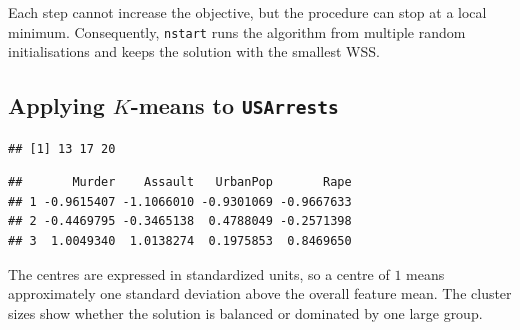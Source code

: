 \documentclass[
  11pt,
]{article}
\newenvironment{Shaded}{\begin{snugshade}}{\end{snugshade}}
\newcommand{\AttributeTok}[1]{\textcolor[rgb]{0.13,0.29,0.53}{#1}}
\newcommand{\DecValTok}[1]{\textcolor[rgb]{0.00,0.00,0.81}{#1}}
\newcommand{\FunctionTok}[1]{\textcolor[rgb]{0.13,0.29,0.53}{\textbf{#1}}}
\newcommand{\NormalTok}[1]{#1}
\newcommand{\OtherTok}[1]{\textcolor[rgb]{0.56,0.35,0.01}{#1}}
\newcommand{\SpecialCharTok}[1]{\textcolor[rgb]{0.81,0.36,0.00}{\textbf{#1}}}
\begin{document}
Each step cannot increase the objective, but the procedure can stop at a
local minimum. Consequently, \texttt{nstart} runs the algorithm from
multiple random initialisations and keeps the solution with the smallest
WSS.

\subsection{\texorpdfstring{Applying \(K\)-means to
\texttt{USArrests}}{Applying K-means to USArrests}}\label{applying-k-means-to-usarrests}

\begin{Shaded}
\end{Shaded}

\begin{verbatim}
## [1] 13 17 20
\end{verbatim}

\begin{Shaded}
\end{Shaded}

\begin{verbatim}
##       Murder    Assault   UrbanPop       Rape
## 1 -0.9615407 -1.1066010 -0.9301069 -0.9667633
## 2 -0.4469795 -0.3465138  0.4788049 -0.2571398
## 3  1.0049340  1.0138274  0.1975853  0.8469650
\end{verbatim}

The centres are expressed in standardized units, so a centre of \(1\)
means approximately one standard deviation above the overall feature
mean. The cluster sizes show whether the solution is balanced or
dominated by one large group.

\begin{Shaded}
\end{Shaded}
\end{document}
